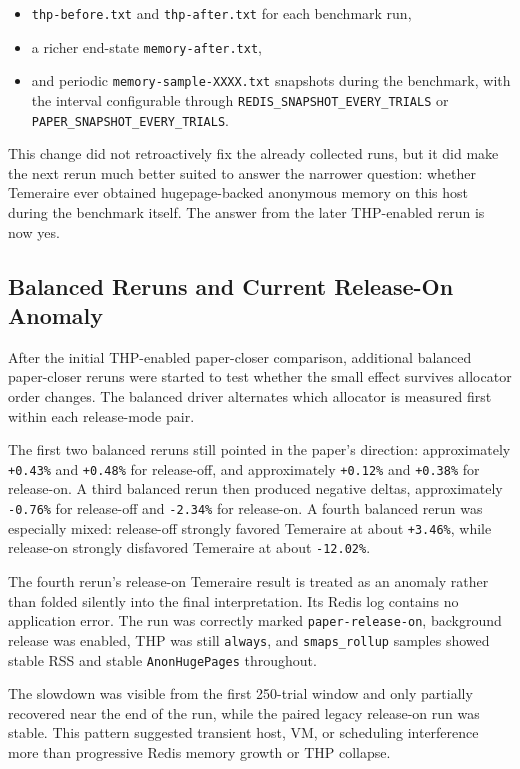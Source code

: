 \documentclass[a4paper,11pt]{article}
\begin{document}
\begin{itemize}[leftmargin=1.5em]
  \item \texttt{thp-before.txt} and \texttt{thp-after.txt} for each benchmark
  run,
  \item a richer end-state \texttt{memory-after.txt},
  \item and periodic \texttt{memory-sample-XXXX.txt} snapshots during the
  benchmark, with the interval configurable through
  \texttt{REDIS\_SNAPSHOT\_EVERY\_TRIALS} or
  \texttt{PAPER\_SNAPSHOT\_EVERY\_TRIALS}.
\end{itemize}

This change did not retroactively fix the already collected runs, but it did
make the next rerun much better suited to answer the narrower question: whether
Temeraire ever obtained hugepage-backed anonymous memory on this host during
the benchmark itself. The answer from the later THP-enabled rerun is now yes.

\subsection{Balanced Reruns and Current Release-On Anomaly}

After the initial THP-enabled paper-closer comparison, additional balanced
paper-closer reruns were started to test whether the small effect survives
allocator order changes. The balanced driver alternates which allocator is
measured first within each release-mode pair.

The first two balanced reruns still pointed in the paper's direction:
approximately \texttt{+0.43\%} and \texttt{+0.48\%} for release-off, and
approximately \texttt{+0.12\%} and \texttt{+0.38\%} for release-on. A third
balanced rerun then produced negative deltas, approximately \texttt{-0.76\%}
for release-off and \texttt{-2.34\%} for release-on. A fourth balanced rerun
was especially mixed: release-off strongly favored Temeraire at about
\texttt{+3.46\%}, while release-on strongly disfavored Temeraire at about
\texttt{-12.02\%}.

The fourth rerun's release-on Temeraire result is treated as an anomaly rather
than folded silently into the final interpretation. Its Redis log contains no
application error. The run was correctly marked \texttt{paper-release-on},
background release was enabled, THP was still \texttt{always}, and
\texttt{smaps\_rollup} samples showed stable RSS and stable
\texttt{AnonHugePages} throughout.

The slowdown was visible from the first 250-trial window and only partially
recovered near the end of the run, while the paired legacy release-on run was
stable. This pattern suggested transient host, VM, or scheduling interference
more than progressive Redis memory growth or THP collapse.
\end{document}
